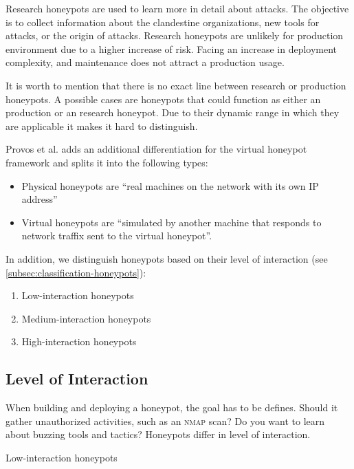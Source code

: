 Research honeypots are used to learn more in detail about attacks. The objective is to collect information about the clandestine organizations, new tools for attacks, or the origin of attacks. Research honeypots are unlikely for production environment due to a higher increase of risk. Facing an increase in deployment complexity, and maintenance does not attract a production usage.

It is worth to mention that there is no exact line between research or production honeypots. A possible cases are honeypots that could function as either an production or an research honeypot. Due to their dynamic range in which they are applicable it makes it hard to distinguish. 

Provos et al. adds an additional differentiation for the virtual honeypot framework \cite{Provos2003} and splits it into the following types:

\begin{itemize}
    \item Physical honeypots are \enquote{real machines on the network with its own IP address}
    \item Virtual honeypots are \enquote{simulated by another machine that responds to network traffix sent to the virtual honeypot}.
\end{itemize}

In addition, we distinguish honeypots based on their level of interaction (see \autoref{subsec:classification-honeypots}):

\begin{enumerate}
    \item Low-interaction honeypots
    \item Medium-interaction honeypots
    \item High-interaction honeypots
\end{enumerate}

\subsection{Level of Interaction}
\label{subsec:classification-honeypots}

When building and deploying a honeypot, the goal has to be defines. Should it gather unauthorized activities, such as an \textsc{nmap} scan? Do you want to learn about buzzing tools and tactics? Honeypots differ in level of interaction.

Low-interaction honeypots\\


